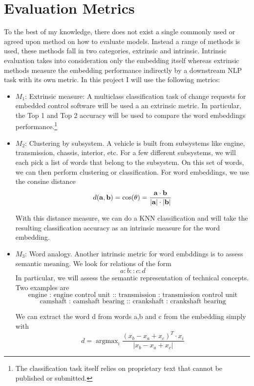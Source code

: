 \documentclass[10pt,a4paper]{article}
\DeclareMathOperator*{\argmax}{argmax} %
\begin{document}
	\section{Evaluation Metrics}
	\label{eval}
	To the best of my knowledge, there does not exist a single commonly used or agreed upon method on how to evaluate models\cite{1901.09785, Schnabel15, 1801.09536}. Instead a range of methods is used, these methods fall in two categories, extrinsic and intrinsic. Intrinsic evaluation takes into consideration only the embedding itself whereas extrinsic methods measure the embedding performance indirectly by a downstream NLP task with its own metric.
	In this project I will use the following metrics:
	\begin{itemize}
		\item \textbf{$M_1$}: Extrinsic measure: A multiclass classification task of change requests for embedded control software will be used a an extrinsic metric. In particular, the Top 1 and Top 2 accuracy will be used to compare the word embeddings performance.\footnote{The classification task itself relies on proprietary text that cannot be published or submitted.}
		
		\item \textbf{$M_2$}: Clustering by subsystem. A vehicle is built from subsystems like engine, transmission, chassis, interior, etc. For a few different subsystems, we will each pick a list of words that belong to the subsystem. On this set of words, we can then perform clustering or classification. For word embeddings, we use the consine distance
		\begin{equation}
               d(\bold{a}, \bold{b})=\cos(\theta)=\frac{\bold{a} \cdot \bold{b}}{|\bold{a}|\cdot|\bold{b}|}
		\end{equation}
		
		With this distance measure, we can do a KNN classification and will take the resulting classification accuracy as an intrinsic measure for the word embedding.  
		
		\item \textbf{$M_3$}: Word analogy. Another intrinsic metric for word embddings is to assess semantic meaning. We look for relations of the form
	    $$ a:b::c:d $$
	    In particular, we will assess the semantic representation of technical concepts. Two examples are 
		$$\text{engine : engine control unit :: transmission : transmission control unit}$$
		$$\text{camshaft : camshaft bearing :: crankshaft : crankshaft bearing}$$
		
		We can extract the word d from words a,b and c from the embedding simply with
		\begin{equation}
		d=\argmax_{i} \frac{(x_b -x_a + x_c)^T\cdot x_i}{|x_b-x_a+x_c|}
		\end{equation}
		


\end{itemize}
\end{document}
